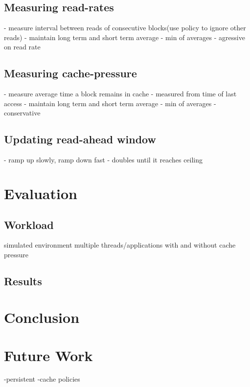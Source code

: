 \documentclass[twocolumn,10pt]{article}
\begin{document}
\subsection{Measuring read-rates}
	- measure interval between reads of consecutive blocks(use policy to ignore other reads)
	- maintain long term and short term average
	- min of averages - agressive on read rate

\subsection{Measuring cache-pressure}
	- measure average time a block remains in cache
		- measured from time of last access
	- maintain long term and short term average
	- min of averages - conservative

\subsection{Updating read-ahead window}
	- ramp up slowly, ramp down fast
	- doubles until it reaches ceiling

\section{Evaluation}

\subsection{Workload}
	simulated environment
	multiple threads/applications
	with and without cache pressure

\subsection{Results}

\section{Conclusion}

\section{Future Work}
	-persistent
	-cache policies
\end{document}
